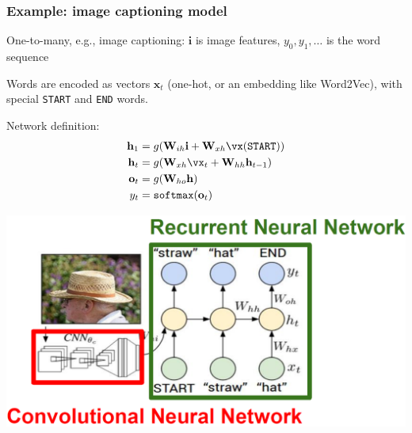 \documentclass[xcolor=dvipsnames]{beamer}
\begin{document}
\begin{frame}
  \frametitle{Example: image captioning model}
  \bi
\item One-to-many, e.g., image captioning: $\mathbf{i}$ is image features,
  $y_0,y_1,\ldots$ is the word sequence
\item Words are encoded as vectors $\mathbf{x}_t$ (one-hot, or an
  embedding like Word2Vec), with special {\tt START} and {\tt END} words.
\ei
\begin{minipage}[c]{.5\linewidth}
  \bi
\item Network definition:
  \begin{align*}
    \mathbf{h}_1&=g(\mathbf{W}_{ih}\mathbf{i}+\mathbf{W}_{xh}\vx(\texttt{START}))\\
    \mathbf{h}_t&=g(\mathbf{W}_{xh}\vx_t+\mathbf{W}_{hh}\mathbf{h}_{t-1})\\
    \mathbf{o}_t&=g(\mathbf{W}_{ho}\mathbf{h})\\
    y_t&=\texttt{softmax}(\mathbf{o}_t)
  \end{align*}

\ei
\end{minipage}%
\begin{minipage}[c]{.5\linewidth}
  \includegraphics[width=.99\textwidth]{ak-imagecaption}
\end{minipage}

\end{frame}
\end{document}
